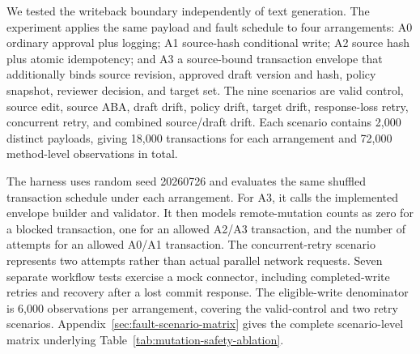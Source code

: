 \documentclass[pdflatex,sn-basic]{sn-jnl}
\begin{document}
We tested the writeback boundary independently of text generation. The experiment applies the same payload and fault schedule to four arrangements: A0 ordinary approval plus logging; A1 source-hash conditional write; A2 source hash plus atomic idempotency; and A3 a source-bound transaction envelope that additionally binds source revision, approved draft version and hash, policy snapshot, reviewer decision, and target set. The nine scenarios are valid control, source edit, source ABA, draft drift, policy drift, target drift, response-loss retry, concurrent retry, and combined source/draft drift. Each scenario contains 2,000 distinct payloads, giving 18,000 transactions for each arrangement and 72,000 method-level observations in total.

The harness uses random seed 20260726 and evaluates the same shuffled transaction schedule under each arrangement. For A3, it calls the implemented envelope builder and validator. It then models remote-mutation counts as zero for a blocked transaction, one for an allowed A2/A3 transaction, and the number of attempts for an allowed A0/A1 transaction. The concurrent-retry scenario represents two attempts rather than actual parallel network requests. Seven separate workflow tests exercise a mock connector, including completed-write retries and recovery after a lost commit response. The eligible-write denominator is 6,000 observations per arrangement, covering the valid-control and two retry scenarios. Appendix~\ref{sec:fault-scenario-matrix} gives the complete scenario-level matrix underlying Table~\ref{tab:mutation-safety-ablation}.
\end{document}
